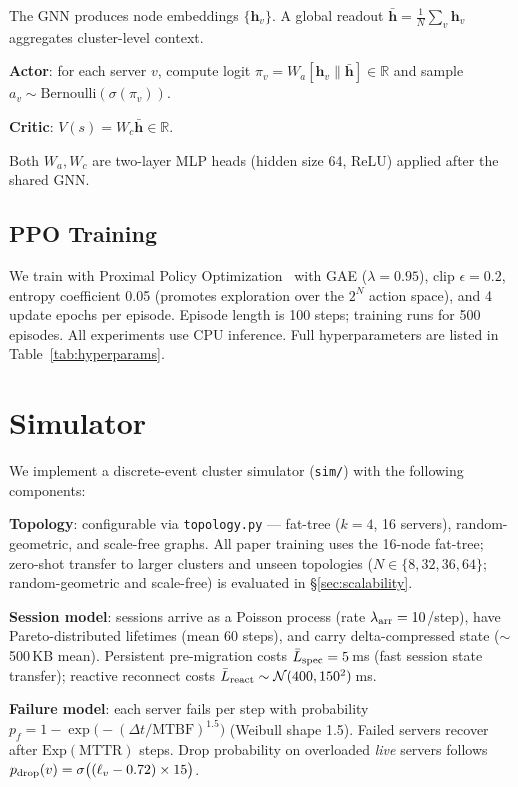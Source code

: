 \documentclass[review,1p]{elsarticle}
\theoremstyle{definition}
\begin{document}
The GNN produces node embeddings $\{\mathbf{h}_v\}$.  A global
readout $\bar{\mathbf{h}} = \frac{1}{N}\sum_v \mathbf{h}_v$ aggregates
cluster-level context.

\textbf{Actor}: for each server $v$, compute logit
$\pi_v = W_a [\mathbf{h}_v \| \bar{\mathbf{h}}] \in \mathbb{R}$
and sample $a_v \sim \text{Bernoulli}(\sigma(\pi_v))$.

\textbf{Critic}: $V(s) = W_c \bar{\mathbf{h}} \in \mathbb{R}$.

Both $W_a, W_c$ are two-layer MLP heads (hidden size 64, ReLU) applied after the shared GNN.

\subsection{PPO Training}

We train with Proximal Policy Optimization~\cite{ppo} with GAE
($\lambda = 0.95$), clip $\epsilon = 0.2$, entropy coefficient 0.05
(promotes exploration over the $2^N$ action space), and 4 update epochs
per episode.  Episode length is 100 steps; training runs for 500
episodes.  All experiments use CPU inference.  Full hyperparameters
are listed in Table~\ref{tab:hyperparams}.

\section{Simulator}
\label{sec:simulator}

We implement a discrete-event cluster simulator (\texttt{sim/})
with the following components:

\textbf{Topology}: configurable via \texttt{topology.py} --- fat-tree
($k{=}4$, 16 servers), random-geometric, and scale-free graphs. All
paper training uses the 16-node fat-tree; zero-shot transfer to larger
clusters and unseen topologies ($N\in\{8,32,36,64\}$; random-geometric
and scale-free) is evaluated in \S\ref{sec:scalability}.

\textbf{Session model}: sessions arrive as a Poisson process (rate
$\lambda_{\rm arr} = 10$/step), have Pareto-distributed lifetimes
(mean 60 steps), and carry delta-compressed state ($\sim$500\,KB mean).
Persistent pre-migration costs $\bar{L}_{\rm spec} = 5$\,ms (fast session state transfer);
reactive reconnect costs $\bar{L}_{\rm react} \sim \mathcal{N}(400,150^2)$\,ms.

\begin{sloppypar}
\textbf{Failure model}: each server fails per step with probability
$p_f = 1 - \exp\!\bigl(-(\Delta t / \text{MTBF})^{1.5}\bigr)$
(Weibull shape 1.5). Failed servers recover after $\text{Exp}(\text{MTTR})$
steps. Drop probability on overloaded \emph{live} servers follows
$p_{\rm drop}(v) = \sigma\bigl((\ell_v - 0.72) \times 15\bigr)$.
\end{sloppypar}
\end{document}
